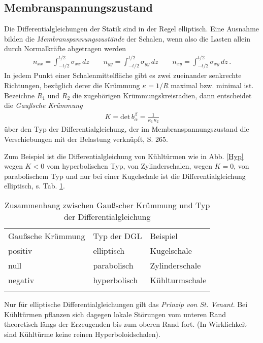 {\textcolor{sectionTitleBlue}{\subsection{Membranspannungszustand}}}
Die Differentialgleichungen der Statik sind in der Regel elliptisch. Eine Ausnahme bilden
die {\em Membranspannungszust\"{a}nde\/} der Schalen, wenn also die Lasten allein durch
Normalkr\"{a}fte abgetragen werden
\begin{align}
n_{xx} = \int_{-t/2}^{t/2} \sigma_{xx}\,dz \qquad n_{yy} = \int_{-t/2}^{t/2} \sigma_{yy}\,dz
\qquad n_{xy} = \int_{-t/2}^{t/2} \sigma_{xy}\,dz \,.
\end{align}
In jedem Punkt einer Schalenmittelfl\"{a}che gibt es zwei zueinander senkrechte Richtungen,
bez\"{u}glich derer die Kr\"{u}mmung $\kappa = 1/R$ maximal bzw. minimal ist. Bezeichne $R_1$
und $R_2$ die zugeh\"{o}rigen Kr\"{u}mmungskreisradien, dann entscheidet die {\em Gau{\ss}sche
Kr\"{u}mmung\/}
\begin{align}
K = \mbox{det}\,b^\beta_\alpha = \frac{1}{\kappa_1\,\kappa_2}
\end{align}
\"{u}ber den Typ der Differentialgleichung, der im Membranspannungszustand die
Verschiebungen mit der Belastung verkn\"{u}pft, \cite{Kraetzig0} S. 265.

Zum Beispiel ist die Differentialgleichung von K\"{u}hlt\"{u}rmen wie in Abb. \ref{Hyp} wegen $K
< 0$ vom hyperbolischen Typ, von Zylinderschalen, wegen $K = 0$, von parabolischem Typ
und nur bei einer Kugelschale ist die Differentialgleichung elliptisch, s. Tab.
\ref{gauss}.
\begin{table}[h]\caption{{\small Zusammenhang zwischen Gau{\ss}scher Kr\"{u}mmung und Typ der Differentialgleichung}}\label{gauss} \vspace{0.3cm}
\begin{tabular}{l  l  l}
\noalign{\hrule\smallskip} Gau{\ss}sche Kr\"{u}mmung & Typ der DGL &
Beispiel\\\noalign{\hrule\smallskip}
positiv & elliptisch & Kugelschale\\
null & parabolisch & Zylinderschale\\
negativ & hyperbolisch & K\"{u}hlturmschale\\\noalign{\hrule\smallskip}
\end{tabular}
\end{table}
Nur f\"{u}r elliptische Differentialgleichungen gilt das {\em Prinzip von St. Venant\/}. Bei
K\"{u}hlt\"{u}rmen pflanzen sich dagegen lokale St\"{o}rungen vom unteren Rand theoretisch l\"{a}ngs der
Erzeugenden bis zum oberen Rand fort. (In Wirklichkeit sind K\"{u}hlt\"{u}rme keine reinen
Hyperboloidschalen).

